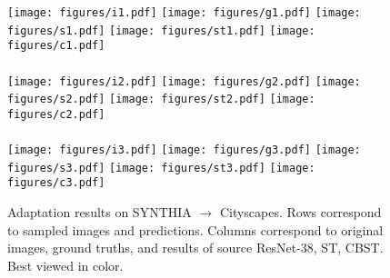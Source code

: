 \documentclass[runningheads]{llncs}
\begin{document}
\begin{figure}[!t]
\centering
{}
\vspace{0.2mm}

\texttt{[image: figures/i1.pdf]}
\texttt{[image: figures/g1.pdf]}
\texttt{[image: figures/s1.pdf]}
\texttt{[image: figures/st1.pdf]}
\texttt{[image: figures/c1.pdf]}\\
\quad\\\vspace{-0.325cm}
\texttt{[image: figures/i2.pdf]}
\texttt{[image: figures/g2.pdf]}
\texttt{[image: figures/s2.pdf]}
\texttt{[image: figures/st2.pdf]}
\texttt{[image: figures/c2.pdf]}\\
\quad\\\vspace{-0.325cm}
\texttt{[image: figures/i3.pdf]}
\texttt{[image: figures/g3.pdf]}
\texttt{[image: figures/s3.pdf]}
\texttt{[image: figures/st3.pdf]}
\texttt{[image: figures/c3.pdf]}
\caption{Adaptation results on SYNTHIA $\rightarrow$ Cityscapes. Rows correspond to sampled images and predictions. Columns correspond to original images, ground truths, and results of source ResNet-38, ST, CBST. Best viewed in color.}\label{syn2city}
\end{figure}
\end{document}
